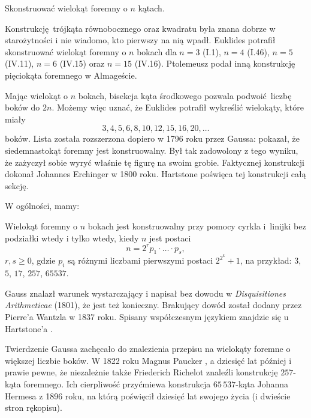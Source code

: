 \begin{problem}
    Skonstruować wielokąt foremny o $n$ kątach.
\end{problem}

Konstrukcję trójkąta równobocznego oraz kwadratu była znana dobrze w starożytności i nie wiadomo, kto pierwszy na nią wpadł.
Euklides potrafił skonstruować wielokąt foremny o $n$ bokach dla $n = 3$ (I.1), $n = 4$ (I.46), $n = 5$ (IV.11), $n = 6$ (IV.15) oraz $n = 15$ (IV.16).
Ptolemeusz podał inną konstrukcję pięciokąta foremnego w Almageście.

Mając wielokąt o $n$ bokach, bisekcja kąta środkowego pozwala podwoić liczbę boków do $2n$.
Możemy więc uznać, że Euklides potrafił wykreślić wielokąty, które miały
\begin{equation}
    3, 4, 5, 6, 8, 10, 12, 15, 16, 20, \ldots
\end{equation}
boków.
Lista została rozszerzona dopiero w 1796 roku przez Gaussa: pokazał, że siedemnastokąt foremny jest konstruowalny.
%
Był tak zadowolony z tego wyniku, że zażyczył sobie wyryć właśnie tę figurę na swoim grobie.
Faktycznej konstrukcji dokonał Johannes Erchinger w 1800 roku.
%
Hartstone \cite[s. 250-259]{hartshorne2000} poświęca tej konstrukcji całą sekcję.

W ogólności, mamy:
\begin{theorem}
    \label{gauss_wantzel}
    Wielokąt foremny o $n$ bokach jest konstruowalny przy pomocy cyrkla i~linijki bez podziałki wtedy i tylko wtedy, kiedy $n$ jest postaci
    \begin{equation}
        n = 2^r p_1 \cdot \ldots \cdot p_s,
    \end{equation}
    $r, s \ge 0$, gdzie $p_i$ są różnymi liczbami pierwszymi postaci $2^{2^k} + 1$, na przykład: $3$, $5$, $17$, $257$, $65537$.
\end{theorem}

Gauss znalazł warunek wystarczający i napisał bez dowodu w \emph{Disquisitiones Arithmeticae} (1801), że jest też konieczny.
Brakujący dowód został dodany przez Pierre'a Wantzla w 1837 roku.
Spisany współczesnym językiem znajdzie się u Hartstone'a \cite[s. 258]{hartshorne2000}.

Twierdzenie Gaussa zachęcało do znalezienia przepisu na wielokąty foremne o większej liczbie boków.
W 1822 roku Magnus Paucker \cite{paucker_1822}, a dziesięć lat później i prawie pewne, że niezależnie także Friederich Richelot \cite{richelot_1832} znaleźli konstrukcję $257$-kąta foremnego. 
%
%
Ich cierpliwość przyćmiewa konstrukcja $65\,537$-kąta Johanna Hermesa z 1896 roku, na którą poświęcił dziesięć lat swojego życia (i dwieście stron rękopisu).

